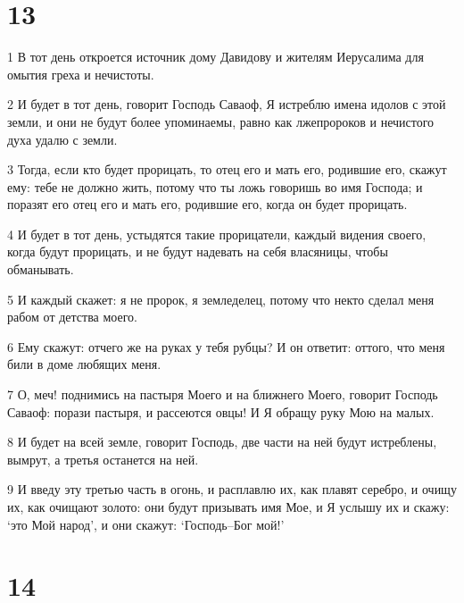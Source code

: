 \chapter{13}

\par 1 В тот день откроется источник дому Давидову и жителям Иерусалима для омытия греха и нечистоты.
\par 2 И будет в тот день, говорит Господь Саваоф, Я истреблю имена идолов с этой земли, и они не будут более упоминаемы, равно как лжепророков и нечистого духа удалю с земли.
\par 3 Тогда, если кто будет прорицать, то отец его и мать его, родившие его, скажут ему: тебе не должно жить, потому что ты ложь говоришь во имя Господа; и поразят его отец его и мать его, родившие его, когда он будет прорицать.
\par 4 И будет в тот день, устыдятся такие прорицатели, каждый видения своего, когда будут прорицать, и не будут надевать на себя власяницы, чтобы обманывать.
\par 5 И каждый скажет: я не пророк, я земледелец, потому что некто сделал меня рабом от детства моего.
\par 6 Ему скажут: отчего же на руках у тебя рубцы? И он ответит: оттого, что меня били в доме любящих меня.
\par 7 О, меч! поднимись на пастыря Моего и на ближнего Моего, говорит Господь Саваоф: порази пастыря, и рассеются овцы! И Я обращу руку Мою на малых.
\par 8 И будет на всей земле, говорит Господь, две части на ней будут истреблены, вымрут, а третья останется на ней.
\par 9 И введу эту третью часть в огонь, и расплавлю их, как плавят серебро, и очищу их, как очищают золото: они будут призывать имя Мое, и Я услышу их и скажу: `это Мой народ', и они скажут: `Господь--Бог мой!'

\chapter{14}

